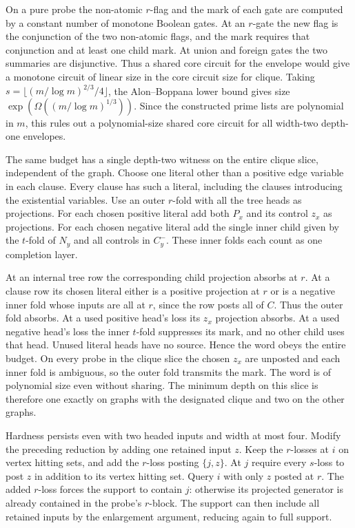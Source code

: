 On a pure probe the non-atomic $r$-flag and
the mark of each gate are computed by a
constant number of monotone Boolean gates.
At an $r$-gate the new flag is the conjunction
of the two non-atomic flags, and the mark
requires that conjunction and at least one
child mark. At union and foreign gates the
two summaries are disjunctive. Thus a shared
core circuit for the envelope would give a
monotone circuit of linear size in the core
circuit size for clique. Taking
$s=\lfloor (m/\log m)^{2/3}/4\rfloor$, the
Alon--Boppana lower bound
\cite[Theorem~3.9]{AlonBoppana1987} gives
size $\exp(\Omega((m/\log m)^{1/3}))$.
Since the constructed prime lists are
polynomial in $m$, this rules out a
polynomial-size shared core circuit for
all width-two depth-one envelopes.

The same budget has a single depth-two witness
on the entire clique slice, independent of the graph.
Choose one literal other than a positive edge
variable in each clause. Every clause has such
a literal, including the clauses introducing the
existential variables. Use an outer $r$-fold with
all the tree heads as projections. For each
chosen positive literal add both $P_x$ and its
control $z_x$ as projections. For each chosen
negative literal add the single inner child
given by the $t$-fold of $N_y$ and all controls
in $C_y^-$. These inner folds each count as
one completion layer.

At an internal tree row the corresponding
child projection absorbs at $r$. At a clause
row its chosen literal either is a positive
projection at $r$ or is a negative inner fold
whose inputs are all at $r$, since the row posts
all of $C$. Thus the outer fold absorbs.
At a used positive head's loss its $z_x$
projection absorbs. At a used negative head's
loss the inner $t$-fold suppresses its mark,
and no other child uses that head. Unused
literal heads have no source. Hence the word
obeys the entire budget. On every probe in
the clique slice the chosen $z_x$ are unposted
and each inner fold is ambiguous, so the outer
fold transmits the mark. The word is of
polynomial size even without sharing.
The minimum depth on this slice is therefore
one exactly on graphs with the designated
clique and two on the other graphs.

Hardness persists even with two headed inputs and width at most
four. Modify the preceding reduction by adding one retained input
$z$. Keep the $r$-losses at $i$ on vertex hitting sets, and add the
$r$-loss posting $\{j,z\}$. At $j$ require every $s$-loss to post
$z$ in addition to its vertex hitting set. Query $i$ with only $z$
posted at $r$. The added $r$-loss forces the support to contain $j$:
otherwise its projected generator is already contained in the
probe's $r$-block. The support can then include all retained inputs
by the enlargement argument, reducing again to full support.

